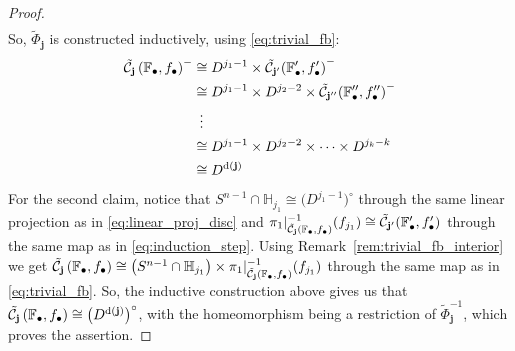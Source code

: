 \begin{proof}
\begin{align*}
\end{align*}
So, $\tilde{\Phi}_{\mathbf{j}}$ is constructed inductively, using \eqref{eq:trivial_fb}:
\begin{align*}
\tilde{\mathcal{C}}_{\mathbf{j}}\left(\mathbb{F}_{\bullet},f_{\bullet}\right)^-&\cong D^{j_1-1}\times\tilde{\mathcal{C}}_{\mathbf{j}'}{\left(\mathbb{F}_{\bullet}',f_{\bullet}'\right)}^-\\
&\cong D^{j_1-1}\times D^{j_2-2}\times \tilde{\mathcal{C}}_{\mathbf{j}''}{\left(\mathbb{F}_{\bullet}'',f_{\bullet}''\right)}^-\\
&\ \,\vdots\\
&\cong D^{j_1-1}\times D^{j_2-2}\times\cdots\times D^{j_k-k}\\
&\cong D^{\mathrm{d}(\mathbf{j})}
\end{align*}
For the second claim, notice that
$S^{n-1}\cap\mathbb{H}_{j_1}\cong\big(D^{j_1-1}\big)^{\circ}$
through the same linear projection as in \eqref{eq:linear_proj_disc} and
$\pi_1|_{\tilde{\mathcal{C}}_{\mathbf{j}}\left(\mathbb{F}_{\bullet},f_{\bullet}\right)}^{-1}(f_{j_1})\cong\tilde{\mathcal{C}}_{\mathbf{j}'}(\mathbb{F}_{\bullet}',f_{\bullet}')$
through the same map as in \eqref{eq:induction_step}. Using Remark~\ref{rem:trivial_fb_interior} we get
$\tilde{\mathcal{C}}_{\mathbf{j}}\left(\mathbb{F}_{\bullet},f_{\bullet}\right)\cong\big(S^{n-1}\cap\mathbb{H}_{j_1}\big)\times\pi_1|_{\tilde{\mathcal{C}}_{\mathbf{j}}\left(\mathbb{F}_{\bullet},f_{\bullet}\right)}^{-1}(f_{j_1})$
through the same map as in \eqref{eq:trivial_fb}.
So, the inductive construction above gives us that
$\tilde{\mathcal{C}}_{\mathbf{j}}\left(\mathbb{F}_{\bullet},f_{\bullet}\right)\cong\big(D^{\mathrm{d}(\mathbf{j})}\big)^{\circ}$,
with the homeomorphism being a restriction of $\tilde{\Phi}_{\mathbf{j}}^{-1}$, which proves the assertion.
\end{proof}

